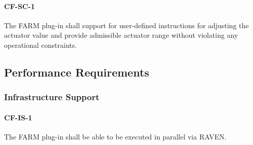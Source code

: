\paragraph{CF-SC-1} 
The FARM plug-in shall support for user-defined instructions for adjusting the actuator value and provide admissible actuator range without violating any operational constraints.
\subsection{Performance Requirements}
\subsubsection{Infrastructure Support}
\paragraph{CF-IS-1} 
The FARM plug-in shall be able to be executed in parallel via RAVEN.
